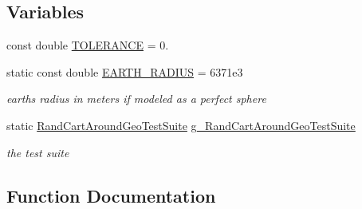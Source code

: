 \subsection*{Variables}
\begin{DoxyCompactItemize}
\item 
const double \hyperlink{rand-cart-around-geo-test_8cc_a89311a98397f9d6967d2cb10d5152d77}{T\+O\+L\+E\+R\+A\+N\+CE} = 0.
\item 
static const double \hyperlink{rand-cart-around-geo-test_8cc_a2cb7703740f4124ff50163bdc2b0d1da}{E\+A\+R\+T\+H\+\_\+\+R\+A\+D\+I\+US} = 6371e3
\begin{DoxyCompactList}\small\item\em earth\textquotesingle{}s radius in meters if modeled as a perfect sphere \end{DoxyCompactList}\item 
static \hyperlink{classRandCartAroundGeoTestSuite}{Rand\+Cart\+Around\+Geo\+Test\+Suite} \hyperlink{rand-cart-around-geo-test_8cc_a27b3ef727181ca7661f4d96d211c78c9}{g\+\_\+\+Rand\+Cart\+Around\+Geo\+Test\+Suite}
\begin{DoxyCompactList}\small\item\em the test suite \end{DoxyCompactList}\end{DoxyCompactItemize}


\subsection{Function Documentation}
